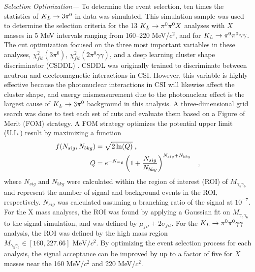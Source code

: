 \documentclass[twocolumn, superscriptaddress, aps,prl]{revtex4-2}
\begin{document}
\textit{Selection Optimization---} To determine the event selection, ten times the statistics of $K_L \rightarrow 3\pi^0$ in data was simulated. This simulation sample was used to determine the selection criteria for the 13 $K_L \rightarrow \pi^0 \pi^0 X$ analyses with $X$ masses in 5 MeV intervals ranging from 160--220 MeV/$c^2$, and for $K_L \rightarrow \pi^0 \pi^0 \gamma \gamma$. The cut optimization focused on the three most important variables in these analyses, $\chi^2_{fit}(3\pi^0)$, $\chi^2_{fit} (2\pi^0\gamma\gamma)$, and a deep learning cluster shape discriminator (CSDDL) \cite{csddl_fpsd}. CSDDL was originally trained to discriminate between neutron and electromagnetic interactions in CSI. However, this variable is highly effective because the photonuclear interactions in CSI will likewise affect the cluster shape, and energy mismeasurement due to the photonuclear effect is the largest cause of $K_L \rightarrow 3\pi^0$ background in this analysis. A three-dimensional grid search was done to test each set of cuts and evaluate them based on a Figure of Merit (FOM) strategy. A FOM strategy optimizes the potential upper limit (U.L.) result by maximizing a function \cite{FOM_Cowan}
\begin{align}
    f(N_{sig}, N_{bkg}) &= \sqrt{2\ln(Q)}\hspace{0.1cm}, \\\hspace{0.1cm} Q &= e^{-N_{sig}}\left(1 + \frac{N_{sig}}{N_{bkg}}\right)^{N_{sig} + N_{bkg}} \hspace{0.3cm},
    \label{eq:fom_function}
\end{align}
where $N_{sig}$ and $N_{bkg}$ were calculated within the region of interest (ROI) of $M_{\gamma_5\gamma_6}$ and represent the number of signal and background events in the ROI, respectively. $N_{sig}$ was calculated assuming a branching ratio of the signal at $10^{-7}$. For the X mass analyses, the ROI was found by applying a Gaussian fit on $M_{\gamma_5\gamma_6}$ to the signal simulation, and was defined by $\mu_{fit} \pm 2\sigma_{fit}$. For the $K_L \rightarrow \pi^0 \pi^0 \gamma \gamma$ analysis, the ROI was defined by the high mass region $M_{\gamma_5\gamma_6} \in[160, 227.66]\text{ MeV/}c^2$. By optimizing the event selection process for each analysis, the signal acceptance can be improved by up to a factor of five for $X$ masses near the 160 MeV/$c^2$ and 220 MeV/$c^2$.
\end{document}
